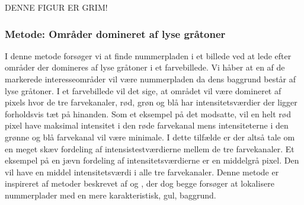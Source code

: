DENNE FIGUR ER GRIM!

\subsubsection{Metode: Områder domineret af lyse gråtoner}
\label{sec:DetectSameness}
I denne metode forsøger vi at finde nummerpladen i et billede ved at lede efter områder der domineres af lyse gråtoner i et farvebillede. Vi håber at en af de markerede interesseområder vil være nummerpladen da dens baggrund består af lyse gråtoner. I et farvebillede vil det sige, at området vil være domineret af pixels hvor de tre farvekanaler, rød, grøn og blå har intensitetsværdier der ligger forholdsvis tæt på hinanden. Som et eksempel på det modsatte, vil en helt rød pixel have maksimal intensitet i den røde farvekanal mens intensiteterne i den grønne og blå farvekanal vil være minimale. I dette tilfælde er der altså tale om en meget skæv fordeling af intensistestværdierne mellem de tre farvekanaler. Et eksempel på en jævn fordeling af intensitetsværdierne er en middelgrå pixel. Den vil have en middel intensitetsværdi i alle tre farvekanaler. Denne metode er inspireret af metoder beskrevet af \cite{ron} og \cite{nijhuis}, der dog begge forsøger at lokalisere nummerplader med en mere karakteristisk, gul, baggrund.

